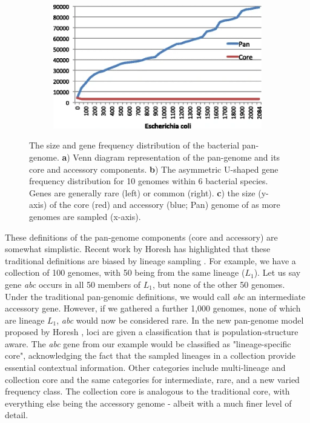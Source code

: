 \begin{figure}
\begin{subfigure}[b]{0.475\textwidth}
         \caption{}
         \label{fig:pangenome-freq}
     \end{subfigure}
     \begin{subfigure}[b]{0.8\textwidth}
        \includegraphics[width=1\linewidth]{Chapter0/Figs/pangenome-size.png}
        \centering
        \caption{}
        \label{fig:pangenome-size}
     \end{subfigure}
    \caption{The size and gene frequency distribution of the bacterial pan-genome. \textbf{a}) Venn diagram representation of the pan-genome and its core and accessory components. \textbf{b}) The asymmetric U-shaped gene frequency distribution for 10 genomes within 6 bacterial species. Genes are generally rare (left) or common (right). \textbf{c}) the size (y-axis) of the core (red) and accessory (blue; Pan) genome of \ecoli{} as more genomes are sampled (x-axis).}
        \label{fig:pangenome}
\end{figure}

\noindent
These definitions of the pan-genome components (core and accessory) are somewhat simplistic. Recent work by Horesh \etal{} has highlighted that these traditional definitions are biased by lineage sampling \cite{Horesh2021}. For example, we have a collection of 100 genomes, with 50 being from the same lineage ($L_1$). Let us say gene \textit{abc} occurs in all 50 members of $L_1$, but none of the other 50 genomes. Under the traditional pan-genomic definitions, we would call \textit{abc} an intermediate accessory gene. However, if we gathered a further 1,000 genomes, none of which are lineage $L_1$, \textit{abc} would now be considered rare. In the new pan-genome model proposed by Horesh \etal{}, loci are given a classification that is population-structure aware. The \textit{abc} gene from our example would be classified as "lineage-specific core", acknowledging the fact that the sampled lineages in a collection provide essential contextual information. Other categories include multi-lineage and collection core and the same categories for intermediate, rare, and a new varied frequency class. The collection core is analogous to the traditional core, with everything else being the accessory genome - albeit with a much finer level of detail.

